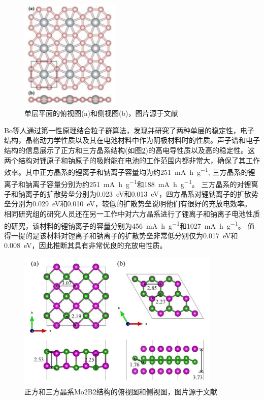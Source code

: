 \begin{figure}[bt]
  \includegraphics[width=0.42\textwidth]{figs/ch1_tib4.png}
  \centering
  \caption{单层平面的俯视图(a)和侧视图(b)，图片源于文献\cite{qu2017two}}
  \label{fig:ch1_tib4}
\end{figure}

Bo等人\cite{bo2019tetragonal}通过第一性原理结合粒子群算法，发现并研究了两种单层的稳定性，电子结构，晶格动力学性质以及其在电池材料中作为阴极材料时的性质。声子谱和电子结构的信息展示了正方和三方晶系结构(如图\ref{fig:ch1_mo2b2})的高电导性质以及高的稳定性。这两个结构对锂原子和钠原子的吸附能在电池的工作范围内都非常大，确保了其工作效率。其中正方晶系的锂离子和钠离子容量均为约\SI{251}{\mA\hour\per\g}, 三方晶系的锂离子和钠离子容量分别为约\SI{251}{\mA\hour\per\g}和\SI{188}{\mA\hour\per\g}。
三方晶系的对锂离子和钠离子的扩散势垒分别为\SI{0.023}{\eV}和\SI{0.013}{\eV}，四方晶系对锂钠离子的扩散势垒分别为\SI{0.029}{\eV}和\SI{0.010}{\eV}，较低的扩散势垒说明他们有很好的充放电效率。
相同研究组的研究人员还在另一工作中对六方晶系\cite{bo2018hexagonal}进行了锂离子和钠离子电池性质的研究，该材料的锂钠离子的容量分别为\SI{456}{\mA\hour\per\g}和\SI{1027}{\mA\hour\per\g}。
值得一提的是该材料对锂离子和钠离子的扩散势垒非常低分别仅为\SI{0.017}{\eV}和\SI{0.008}{\eV}，因此推断其具有非常优良的充放电性质。

\begin{figure}[bt]
  \includegraphics[width=0.86\textwidth]{figs/ch1_mo2b2.png}
  \centering
  \caption{正方和三方晶系Mo2B2结构的俯视图和侧视图，图片源于文献\cite{bo2019tetragonal}}
  \label{fig:ch1_mo2b2}
\end{figure}

